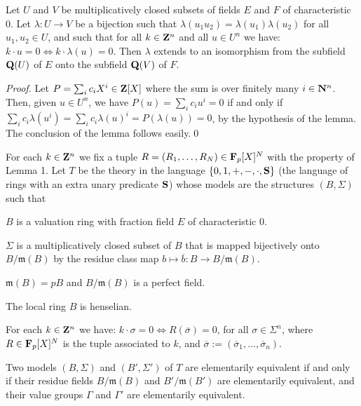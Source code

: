 \documentclass[amalog]{svjour}
\def \Q {  {\bold Q} }
\def \F {{\bold F}}
\def \N {\bold N}
\def \Z {{\bold Z}}
\def \m{\mathfrak{m}}
\def \bar{\overline}
\begin{document}
\begin{lemma}Let $U$ and $V$ be multiplicatively closed subsets of
fields $E$ and $F$
of characteristic $0$. Let $\lambda : U \to V$ be a bijection such that $\lambda(u_1u_2) =
\lambda(u_1)\lambda(u_2)$ for all $u_1,u_2\in U$, and such that for all
$ k \in \Z^n$ and all $u \in U^n$ we have:
$ k \cdot u = 0  \Longleftrightarrow  k \cdot \lambda(u) = 0$.
Then $\lambda$ extends to an isomorphism from the subfield $\Q(U)$ of $E$ onto the subfield
$\Q(V)$ of $F$.\end{lemma}
\begin{proof}Let $P= \sum_i c_iX^i\in \Z[X]$ where the sum is over finitely
many $i\in \N^n$. Then, given $u\in U^n$, we have  $P(u) = \sum_i c_iu^i= 0$ if and only if
$\sum_i c_i \lambda(u^i) = \sum_i c_i\lambda(u)^i = P(\lambda(u))  = 0$, by the hypothesis of
the lemma. The conclusion of the lemma follows easily.\qed\end{proof}

 For each $k\in \Z^n$ we fix a tuple $R = (R_1,\dots,R_N)\in \F_p[X]^N$ with the
property of Lemma 1.
Let $T$ be the theory in the language
$\{0,1,+,-,\cdot,{\bold S} \}$ (the language of rings with an extra unary predicate
${\bold S}$) whose models are the structures $(B,\Sigma)$
such that \begin{description}[(2)]
\item[(1)]  $B$ is a valuation ring with fraction field $E$ of
characteristic $0$.
\item[(2)]  $\Sigma$ is a multiplicatively closed subset of $B$ that is
mapped bijectively
onto $B/\m(B)$ by the residue class map $b \mapsto \bar b : B \to B/\m(B)$.
\item[(3)]  $\m(B) = pB$ and $B/\m(B)$ is a perfect field.
\item[(4)] The local ring $B$ is henselian.
\item[(5)] For each $k\in \Z^n$ we have: $k\cdot \sigma = 0
\Longleftrightarrow R(\bar \sigma) = 0$,
for all $\sigma\in \Sigma^n$, where $R\in \F_p[X]^N$ is the tuple associated to $k$, and
$\bar \sigma := (\bar \sigma_1,\dots,\bar \sigma_n)$.
\end{description}

\begin{thm} Two models $(B,\Sigma)$ and $(B',\Sigma')$ of $T$ are
elementarily
equivalent if and only if their residue fields $B/\m(B)$ and $B'/\m(B')$ are elementarily equivalent,
and their value groups $\Gamma$ and $\Gamma'$ are elementarily equivalent.
\end{thm}
\end{document}
